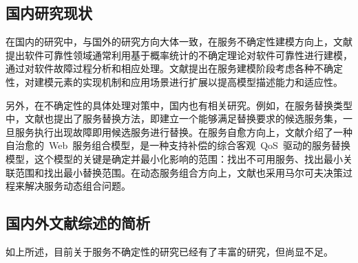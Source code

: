 %
%


\subsection{国内研究现状}

在国内的研究中，与国外的研究方向大体一致，在服务不确定性建模方向上，文献提出软件可靠性领域通常利用基于概率统计的不确定理论对软件可靠性进行建模，通过对软件故障过程分析和相应处理。文献提出在服务建模阶段考虑各种不确定性，对建模元素的实现机制和应用场景进行扩展以提高模型描述能力和适应性。

另外，在不确定性的具体处理对策中，国内也有相关研究。例如，在服务替换类型中，文献\cite{guo2007angel}也提出了服务替换方法，即建立一个能够满足替换要求的候选服务集，一旦服务执行出现故障即用候选服务进行替换。在服务自愈方向上，文献\cite{yin2009self}介绍了一种自治愈的~Web~服务组合模型，是一种支持补偿的综合客观~QoS~驱动的服务替换模型，这个模型的关键是确定并最小化影响的范围：找出不可用服务、找出最小关联范围和找出最小替换范围。在动态服务组合方向上，文献\cite{gao2005web}也采用马尔可夫决策过程来解决服务动态组合问题。

\subsection{国内外文献综述的简析}
如上所述，目前关于服务不确定性的研究已经有了丰富的研究，但尚显不足。

